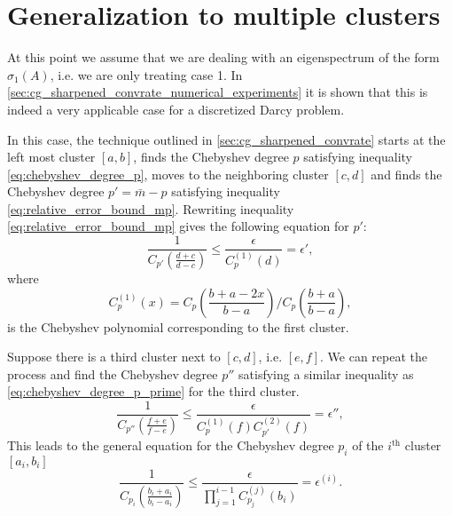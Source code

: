 \section{Generalization to multiple clusters}\label{sec:multiple_clusters}
At this point we assume that we are dealing with an eigenspectrum of the form $\sigma_1(A)$, i.e. we are only treating case 1. In \cref{sec:cg_sharpened_convrate_numerical_experiments} it is shown that this is indeed a very applicable case for a discretized Darcy problem.

In this case, the technique outlined in \cref{sec:cg_sharpened_convrate} starts at the left most cluster $[a,b]$, finds the Chebyshev degree $p$ satisfying inequality \ref{eq:chebyshev_degree_p}, moves to the neighboring cluster $[c,d]$ and finds the Chebyshev degree $p' = \bar{m} - p$ satisfying inequality \ref{eq:relative_error_bound_mp}. Rewriting inequality \ref{eq:relative_error_bound_mp} gives the following equation for $p'$:
\begin{equation}
    \frac{1}{C_{p'}\left(\frac{d+c}{d-c}\right)} \leq \frac{\epsilon}{{C}^{(1)}_p(d)} = \epsilon',
    \label{eq:chebyshev_degree_p_prime}
\end{equation}
where
\[
    C^{(1)}_p(x) = C_p\left(\frac{b + a - 2x}{b - a}\right) /C_{p}\left(\frac{b+a}{b-a}\right),
\]
is the Chebyshev polynomial corresponding to the first cluster.

Suppose there is a third cluster next to $[c,d]$, i.e. $[e,f]$. We can repeat the process and find the Chebyshev degree $p''$ satisfying a similar inequality as \ref{eq:chebyshev_degree_p_prime} for the third cluster. 
\[
    \frac{1}{C_{p''}\left(\frac{f+e}{f-e}\right)} \leq \frac{\epsilon}{C^{(1)}_p(f)C^{(2)}_{p'}(f)} = \epsilon'',
\]
This leads to the general equation for the Chebyshev degree $p_i$ of the $i^{\text{th}}$ cluster $[a_i, b_i]$
\begin{equation}
    \frac{1}{C_{p_i}\left(\frac{b_i + a_i}{b_i - a_i}\right)} \leq \frac{\epsilon}{\prod_{j=1}^{i-1} C^{(j)}_{p_j}(b_i)} = \epsilon^{(i)}.
    \label{eq:chebyshev_degree_p_i}
\end{equation}


